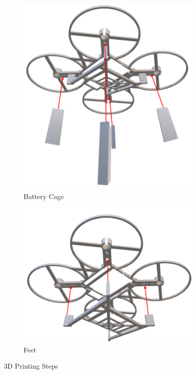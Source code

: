 \begin{figure}[H]
\begin{subfigure}[b]{0.44\linewidth}
    \includegraphics[width=\linewidth]{img/assembly-7.png}
    \caption{Battery Cage}
  \end{subfigure}
  \hfill
  \begin{subfigure}[b]{0.48\linewidth}
    \centering
    \includegraphics[width=\linewidth]{img/assembly-8.png}
    \caption{Feet}
  \end{subfigure}
  \caption{3D Printing Steps}
\end{figure}

